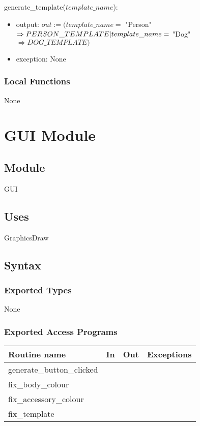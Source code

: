 \documentclass[12pt, titlepage]{article}
\begin{document}
generate\_template($template\_name$):
\begin{itemize}
\item output: $out := (template\_name =$ "Person" $\Rightarrow PERSON\_TEMPLATE | template\_name \\ =$ "Dog" $\Rightarrow DOG\_TEMPLATE)$
\item exception: None
\end{itemize}

\subsubsection*{Local Functions}
None

\newpage

\section* {GUI Module}

\subsection*{Module}

GUI

\subsection* {Uses}

GraphicsDraw

\subsection* {Syntax}

\subsubsection* {Exported Types}

None

\subsubsection* {Exported Access Programs}

\begin{tabular}{| l | l | l | l |}
\hline
\textbf{Routine name} & \textbf{In} & \textbf{Out} & \textbf{Exceptions}\\
\hline
generate\_button\_clicked &  &  & \\
\hline
fix\_body\_colour &  &   & \\
\hline
fix\_accessory\_colour  &  &  & \\
\hline
fix\_template & &  & \\

\hline
\end{tabular}
\end{document}
